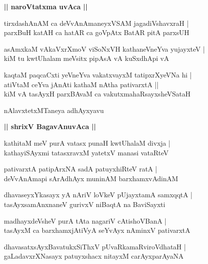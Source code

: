 \documentclass[twoside,12pt,openright]{book}
\newcounter{shloka}[chapter]
\def\uvaca#1{\centerline{{\large\textbf{#1}}}}
\begin{document}
\uvaca{|| naroVtatxma uvAca ||}

\begin{shloka}%
tirxdashAnAM ca deVvAnAmaneyxVSAM jagadiVshavxraH |\\
parxBuH katAH ca hatAR ca goVpAtx BatAR pitA parxsUH 
\end{shloka}

\begin{shloka}%
asAmxkaM vAkaVxrXmoV viSoNxVH kathaneVneYva yujayxteV |\\
kiM tu kwtUhalam meVsitx pipAsA vA kuSxdhApi vA
\end{shloka}

\begin{shloka}%
kaqtaM paqcaCxti yeVneYva vakatxvayxM tatipxrXyeVNa hi |\\
atiVtaM ceYva jAnAti kathaM nAtha pativarxtA ||\\
kiM vA tasAyxH parxBAvaM ca vakutxmahaRsayxsheVSataH 
\end{shloka}

\begin{center}
nAlavxtetxMTaneya adhAyxyavu
\end{center}

\uvaca{|| shrixV BagavAnuvAca ||}

\begin{shloka}%
kathitaM meV purA vatasx punaH kwtUhalaM divxja |\\
kathayiSAyxmi tatasxravxM yatetxV manasi vataRteV
\end{shloka}

\begin{shloka}%
pativarxtA patipArxNA sadA patuyxhiRteV ratA |\\
deVvAnAmapi sArAdhAyx muninAM barxhamxvAdinAM 
\end{shloka}

\begin{shloka}%
dhavaseyxYkasayx yA nAriV loVkeV pUjayxtamA samxqqtA |\\
tasAyxsamAnxnaneV gurivxV niBaqtA na BaviSayxti
\end{shloka}

\begin{shloka}%
madhayxdeVsheV purA tAta nagariV cAtishoVBanA |\\
tasAyxM ca barxhamxjAtiVyA seYvAyx nAminxV pativarxtA 
\end{shloka}

\begin{shloka}%
dhavasatxsAyxBavatukxSiThxV pUvaRkamaRviroVdhataH |\\
gaLadavxrXNasayx patuyxshacx nitayxM carAyxparAyaNA
\end{shloka}
\end{document}
